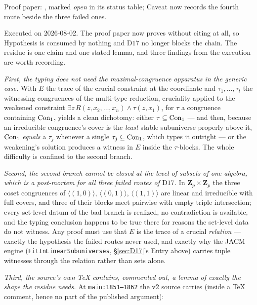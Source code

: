 Proof paper: , marked \emph{open} in its status table;
Caveat  now records the fourth route beside the three
failed ones.

\begin{entry}\label{ent:route-four}
Executed on 2026-08-02. The proof paper now proves
 without citing
 at all, so Hypothesis  is
consumed by nothing and $\mathrm D17$ no longer blocks the chain. The
residue is one claim and one stated lemma, and three findings from the
execution are worth recording.

\emph{First, the typing does not need the maximal-congruence apparatus in
the generic case.} With $E$ the trace of the crucial constraint at the
coordinate and $\tau_{1},\dots,\tau_{t}$ the witnessing congruences of the
multi-type reduction, cruciality applied to the weakened constraint $\exists
z\,R(z,x_{2},\dots,x_{n})\wedge\tau(z,x_{1})$, for $\tau$ a congruence
containing $\operatorname{Con}_1$, yields a clean dichotomy: either $\tau\subseteq\operatorname{Con}_1$
--- and then, because an irreducible congruence's cover is the \emph{least}
stable subuniverse properly above it, $\operatorname{Con}_1$ \emph{equals} a $\tau_{j}$
whenever a single $\tau_{j}\subseteq\operatorname{Con}_1$, which types it outright --- or
the weakening's solution produces a witness in $E$ inside the $\tau$-blocks.
The whole difficulty is confined to the second branch.

\emph{Second, the second branch cannot be closed at the level of subsets of
one algebra, which is a post-mortem for all three failed routes of
$\mathrm D17$.} In $\mathbf Z_{p}\times\mathbf Z_{p}$ the three coset
congruences of $\langle(1,0)\rangle$, $\langle(0,1)\rangle$,
$\langle(1,1)\rangle$ are linear and irreducible with full covers, and three
of their blocks meet pairwise with empty triple intersection; every
set-level datum of the bad branch is realized, no contradiction is
available, and the typing conclusion happens to be true there for reasons
the set-level data do not witness. Any proof must use that $E$ is the trace
of a crucial \emph{relation} --- exactly the hypothesis the failed routes
never used, and exactly why the JACM engine
(\texttt{FitInLinearSubuniverses}, \S\ref{sec:D17}'s Entry above) carries
tuple witnesses through the relation rather than sets alone.

\emph{Third, the source's own \TeX{} contains, commented out, a lemma of
exactly the shape the residue needs.} At \texttt{main:1851--1862} the v2
source carries (inside a \TeX{} comment, hence no part of the published
argument):


\end{entry}
